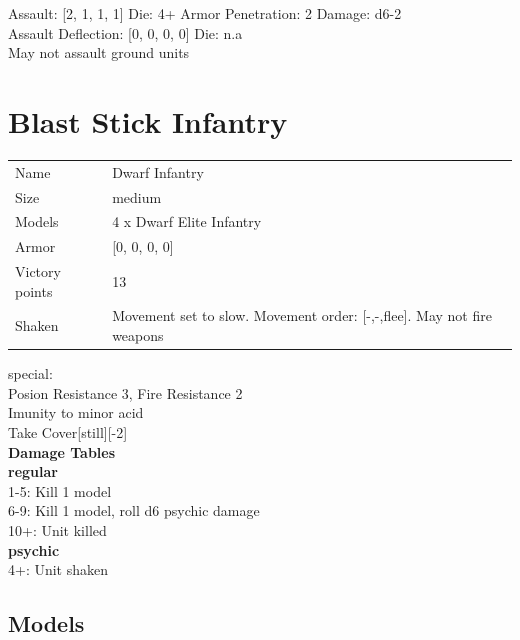 Assault: [2, 1, 1, 1] Die: 4+ Armor Penetration: 2 Damage: d6-2 \\
Assault Deflection: [0, 0, 0, 0] Die: n.a\\
\indent May not assault ground units\\ 
 



 















\clearpage

\section{ Blast Stick Infantry }

\begin{tabular}{ll}
  Name & Dwarf Infantry \\
  Size & medium\\
  Models & 4 x Dwarf Elite Infantry\\
  Armor & [0, 0, 0, 0]\\
  Victory points & 13\\
  Shaken & Movement set to slow. Movement order: [-,-,flee]. May not fire weapons\\
\end{tabular}
special: \\
Posion Resistance 3, Fire Resistance 2\\ 
Imunity to minor acid\\ 
Take Cover[still][-2]\\ 



{\bf Damage Tables} \\
 {\bf regular } \\
1-5: Kill 1 model \\
6-9: Kill 1 model, roll d6 psychic damage \\
10+: Unit killed \\
 {\bf psychic } \\
4+: Unit shaken \\


\clearpage

\subsection{ Models }

